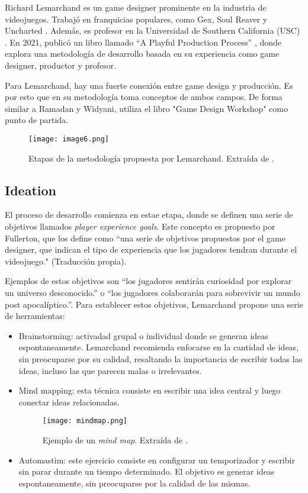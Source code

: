 %
%
\par Richard Lemarchand es un game designer prominente en la industria de videojuegos. Trabajó en franquicias populares, como Gex, Soul Reaver y Uncharted \cite{RichardLemarchandcom}. Además, es profesor en la Universidad de Southern California (USC) \cite{RichardLemarchandcom}. En 2021, publicó un libro llamado “A Playful Production Process” \cite{lemarchandPlayfulProductionProcess2021}, donde explora una metodología de desarrollo basada en su experiencia como game designer, productor y profesor.  
\par Para Lemarchand, hay una fuerte conexión entre game design y producción. Es por esto que en su metodología toma conceptos de ambos campos. De forma similar a Ramadan y Widyani, utiliza el libro "Game Design Workshop" \cite{fullertonGameDesignWorkshop2008} como punto de partida.
%
\begin{figure}[H]
  \centering
  \texttt{[image: image6.png]}
  \caption{Etapas de la metodología propuesta por Lemarchand. Extraída de \cite{lemarchandPlayfulProductionProcess2021}.}
  \label{fig:x proceso de desarrollo Lemarchand}
\end{figure}
%
%
%
\subsection{Ideation}
El proceso de desarrollo comienza en estae etapa, donde se definen una serie de objetivos llamados \textit{player experience goals}. Este concepto es propuesto por Fullerton, que los define como ``una serie de objetivos propuestos por el game designer, que indican el tipo de experiencia que los jugadores tendran durante el videojuego." \cite{fullertonGameDesignWorkshop2008} (Traducción propia).
\par Ejemplos de estos objetivos son ``los jugadores sentirán curiosidad por explorar un universo desconocido.'' o ``los jugadores colaborarán para sobrevivir un mundo post apocalíptico.''. Para establecer estos objetivos, Lemarchand propone una serie de herramientas:
\begin{itemize}
    \item Brainstorming: activadad grupal o individual donde se generan ideas espontaneamente. Lemarchand recomienda enfocarse en la cantidad de ideas, sin preocuparse por su calidad, resaltando la importancia de escribir todas las ideas, incluso las que parecen malas o irrelevantes.
    \item Mind mapping: esta técnica consiste en escribir una idea central y luego conectar ideas relacionadas. 
    \begin{figure}[H]
        \centering
        \texttt{[image: mindmap.png]}
        \caption{Ejemplo de un \textit{mind map}. Extraída de \cite{lemarchandPlayfulProductionProcess2021}.}
        \label{fig:x ejemplo de un mind map Lemarchand}
    \end{figure} 
    \item Automastim: este ejercicio consiste en configurar un temporizador y escribir sin parar durante un tiempo determinado. El objetivo es generar ideas espontaneamente, sin preocuparse por la calidad de las mismas.
\end{itemize}
%
%
